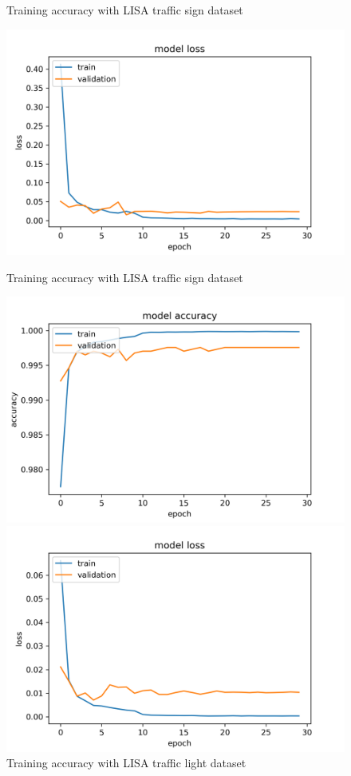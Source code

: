 \documentclass{article}
\begin{document}
\begin{figure}
\begin{minipage}{.42\textwidth}
    \caption{Training accuracy with LISA traffic sign dataset}
    \label{fig:fig_8}
  \end{minipage}
  \begin{minipage}{.42\textwidth}
    \centering
    \includegraphics[width=0.95\linewidth]{model_loss.png}
    \caption{Training accuracy with LISA traffic sign dataset}
    \label{fig:fig_9}
  \end{minipage}
  \centering
  \begin{minipage}{.42\textwidth}
  	\centering
    \includegraphics[width=0.95\linewidth]{model_accuracy_traffic_light.png}
    \caption{Training accuracy with LISA traffic light dataset}
    \label{fig:fig_10}
  \end{minipage}
  \begin{minipage}{.42\textwidth}
    \centering
    \includegraphics[width=0.95\linewidth]{model_loss_traffic_light.png}

\end{minipage}
\end{figure}
\end{document}
